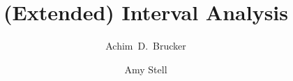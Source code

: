 \usepackage{pdflscape}
\usepackage{booktabs}
\newcommand{\sep}{\texorpdfstring{\\}{, }}
\title{(Extended) Interval Analysis}
\author{Achim~D.~Brucker\textsuperscript{} \and Amy Stell\textsuperscript{}}%
\publishers{
  Department of Computer Science\sep University of Exeter\sep Exeter, UK\sep \texttt{\{a.brucker,a.stell\}@exeter.ac.uk}
}


